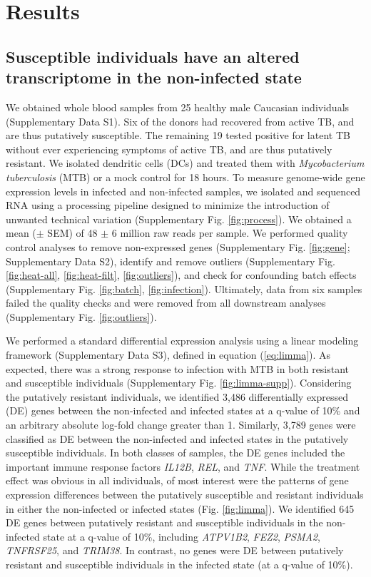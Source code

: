 \documentclass[fleqn,10pt]{wlscirep}
\begin{document}
\section*{Results}

\subsection*{Susceptible individuals have an altered transcriptome in the non-infected state}

We obtained whole blood samples from 25 healthy male Caucasian
individuals (Supplementary Data S1). Six of the donors had recovered
from active TB, and are thus putatively susceptible. The remaining 19
tested positive for latent TB without ever experiencing symptoms of
active TB, and are thus putatively resistant. We isolated dendritic
cells (DCs) and treated them with \emph{Mycobacterium
}\emph{tuberculosis} (MTB) or a mock control for 18 hours. To measure
genome-wide gene expression levels in infected and non-infected
samples, we isolated and sequenced RNA using a processing pipeline
designed to minimize the introduction of unwanted technical variation
(Supplementary Fig. \ref{fig:process}). We obtained a mean ($\pm$ SEM)
of 48 $\pm$ 6 million raw reads per sample. We performed quality
control analyses to remove non-expressed genes (Supplementary Fig.
\ref{fig:gene}; Supplementary Data S2), identify and remove outliers
(Supplementary Fig. \ref{fig:heat-all}, \ref{fig:heat-filt},
\ref{fig:outliers}), and check for confounding batch effects
(Supplementary Fig. \ref{fig:batch}, \ref{fig:infection}). Ultimately,
data from six samples failed the quality checks and were removed from
all downstream analyses (Supplementary Fig. \ref{fig:outliers}).

We performed a standard differential expression analysis using a
linear modeling framework (Supplementary Data S3), defined in equation
(\ref{eq:limma}). As expected, there was a strong response to
infection with MTB in both resistant and susceptible individuals
(Supplementary Fig. \ref{fig:limma-supp}). Considering the putatively
resistant individuals, we identified 3,486 differentially expressed
(DE) genes between the non-infected and infected states at a q-value
of 10\% and an arbitrary absolute log-fold change greater than 1.
Similarly, 3,789 genes were classified as DE between the non-infected
and infected states in the putatively susceptible individuals. In both
classes of samples, the DE genes included the important immune
response factors \emph{IL12B}, \emph{REL}, and \emph{TNF}. While the
treatment effect was obvious in all individuals, of most interest were
the patterns of gene expression differences between the putatively
susceptible and resistant individuals in either the non-infected or
infected states (Fig. \ref{fig:limma}). We identified 645 DE genes
between putatively resistant and susceptible individuals in the
non-infected state at a q-value of 10\%, including \emph{ATPV1B2},
\emph{FEZ2}, \emph{PSMA2}, \emph{TNFRSF25}, and \emph{TRIM38}. In
contrast, no genes were DE between putatively resistant and
susceptible individuals in the infected state (at a q-value of 10\%).
\end{document}
